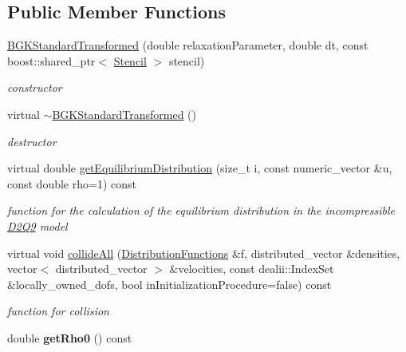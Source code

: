 \subsection*{Public Member Functions}
\begin{DoxyCompactItemize}
\item 
\hypertarget{classnatrium_1_1BGKStandardTransformed_ae53d86d6ae640cc598b152538e347737}{
\hyperlink{classnatrium_1_1BGKStandardTransformed_ae53d86d6ae640cc598b152538e347737}{BGKStandardTransformed} (double relaxationParameter, double dt, const boost::shared\_\-ptr$<$ \hyperlink{classnatrium_1_1Stencil}{Stencil} $>$ stencil)}
\label{classnatrium_1_1BGKStandardTransformed_ae53d86d6ae640cc598b152538e347737}

\begin{DoxyCompactList}\small\item\em constructor \item\end{DoxyCompactList}\item 
virtual \hyperlink{classnatrium_1_1BGKStandardTransformed_a07dc7f5ccaf1abaa725a7b62a2b79ac4}{$\sim$BGKStandardTransformed} ()
\begin{DoxyCompactList}\small\item\em destructor \item\end{DoxyCompactList}\item 
virtual double \hyperlink{classnatrium_1_1BGKStandardTransformed_a870465cc026f92c8ffba899af6f95634}{getEquilibriumDistribution} (size\_\-t i, const numeric\_\-vector \&u, const double rho=1) const 
\begin{DoxyCompactList}\small\item\em function for the calculation of the equilibrium distribution in the incompressible \hyperlink{classnatrium_1_1D2Q9}{D2Q9} model \item\end{DoxyCompactList}\item 
virtual void \hyperlink{classnatrium_1_1BGKStandardTransformed_aaa2e752c6aa2294f1ebeb9d326ba9eb8}{collideAll} (\hyperlink{classnatrium_1_1DistributionFunctions}{DistributionFunctions} \&f, distributed\_\-vector \&densities, vector$<$ distributed\_\-vector $>$ \&velocities, const dealii::IndexSet \&locally\_\-owned\_\-dofs, bool inInitializationProcedure=false) const 
\begin{DoxyCompactList}\small\item\em function for collision \item\end{DoxyCompactList}\item 
\hypertarget{classnatrium_1_1BGKStandardTransformed_a883401ad796f196bcc47456b31159eae}{
double {\bfseries getRho0} () const }
\label{classnatrium_1_1BGKStandardTransformed_a883401ad796f196bcc47456b31159eae}


\end{DoxyCompactItemize}
